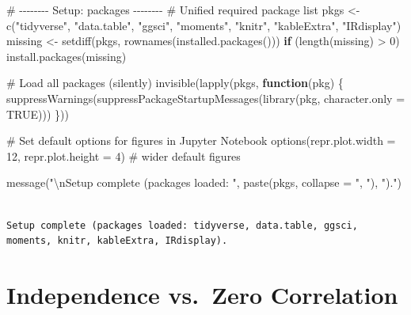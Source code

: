 \documentclass[
  12pt,
  letterpaper,
]{scrbook}
\newenvironment{Shaded}{\begin{snugshade}}{\end{snugshade}}
\newcommand{\AttributeTok}[1]{\textcolor[rgb]{0.40,0.45,0.13}{#1}}
\newcommand{\CommentTok}[1]{\textcolor[rgb]{0.37,0.37,0.37}{#1}}
\newcommand{\ConstantTok}[1]{\textcolor[rgb]{0.56,0.35,0.01}{#1}}
\newcommand{\ControlFlowTok}[1]{\textcolor[rgb]{0.00,0.23,0.31}{\textbf{#1}}}
\newcommand{\DecValTok}[1]{\textcolor[rgb]{0.68,0.00,0.00}{#1}}
\newcommand{\FunctionTok}[1]{\textcolor[rgb]{0.28,0.35,0.67}{#1}}
\newcommand{\NormalTok}[1]{\textcolor[rgb]{0.00,0.23,0.31}{#1}}
\newcommand{\OtherTok}[1]{\textcolor[rgb]{0.00,0.23,0.31}{#1}}
\newcommand{\SpecialCharTok}[1]{\textcolor[rgb]{0.37,0.37,0.37}{#1}}
\newcommand{\StringTok}[1]{\textcolor[rgb]{0.13,0.47,0.30}{#1}}
\theoremstyle{definition}
\theoremstyle{plain}
\theoremstyle{remark}
\begin{document}
\begin{Shaded}
\begin{Highlighting}[]
\CommentTok{\# {-}{-}{-}{-}{-}{-}{-}{-} Setup: packages {-}{-}{-}{-}{-}{-}{-}{-}}
\CommentTok{\# Unified required package list}
\NormalTok{pkgs }\OtherTok{\textless{}{-}} \FunctionTok{c}\NormalTok{(}\StringTok{"tidyverse"}\NormalTok{, }\StringTok{"data.table"}\NormalTok{, }\StringTok{"ggsci"}\NormalTok{, }\StringTok{"moments"}\NormalTok{, }\StringTok{"knitr"}\NormalTok{, }\StringTok{"kableExtra"}\NormalTok{, }\StringTok{"IRdisplay"}\NormalTok{)}
\NormalTok{missing }\OtherTok{\textless{}{-}} \FunctionTok{setdiff}\NormalTok{(pkgs, }\FunctionTok{rownames}\NormalTok{(}\FunctionTok{installed.packages}\NormalTok{()))}
\ControlFlowTok{if}\NormalTok{ (}\FunctionTok{length}\NormalTok{(missing) }\SpecialCharTok{\textgreater{}} \DecValTok{0}\NormalTok{) }\FunctionTok{install.packages}\NormalTok{(missing)}

\CommentTok{\# Load all packages (silently)}
\FunctionTok{invisible}\NormalTok{(}\FunctionTok{lapply}\NormalTok{(pkgs, }\ControlFlowTok{function}\NormalTok{(pkg) \{}
  \FunctionTok{suppressWarnings}\NormalTok{(}\FunctionTok{suppressPackageStartupMessages}\NormalTok{(}\FunctionTok{library}\NormalTok{(pkg, }\AttributeTok{character.only =} \ConstantTok{TRUE}\NormalTok{)))}
\NormalTok{\}))}

\CommentTok{\# Set default options for figures in Jupyter Notebook}
\FunctionTok{options}\NormalTok{(}\AttributeTok{repr.plot.width =} \DecValTok{12}\NormalTok{, }\AttributeTok{repr.plot.height =} \DecValTok{4}\NormalTok{)  }\CommentTok{\# wider default figures}

\FunctionTok{message}\NormalTok{(}\StringTok{"}\SpecialCharTok{\textbackslash{}n}\StringTok{Setup complete (packages loaded: "}\NormalTok{, }\FunctionTok{paste}\NormalTok{(pkgs, }\AttributeTok{collapse =} \StringTok{", "}\NormalTok{), }\StringTok{")."}\NormalTok{)}
\end{Highlighting}
\end{Shaded}

\begin{verbatim}

Setup complete (packages loaded: tidyverse, data.table, ggsci, moments, knitr, kableExtra, IRdisplay).
\end{verbatim}

\section{Independence vs.~Zero
Correlation}\label{independence-vs.-zero-correlation}
\end{document}
